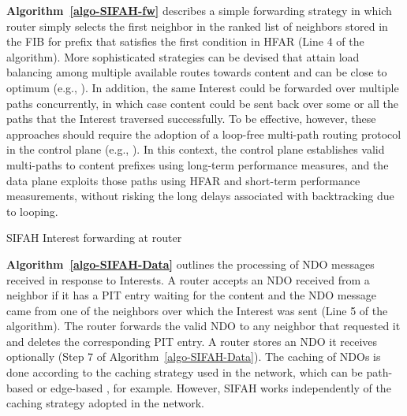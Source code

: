 \documentclass{ancs15-alternate}
\begin{document}
{\bf Algorithm~\ref{algo-SIFAH-fw} } describes a simple forwarding strategy 
in which router  simply selects the 
first  neighbor 
in the ranked list of neighbors stored in the FIB for prefix 
that satisfies the first condition in HFAR (Line 4 of the algorithm).
More sophisticated strategies can be devised that attain load balancing among multiple available  routes towards content and can be close to optimum (e.g., \cite{vutukury}). In addition, the same Interest could be forwarded over multiple paths concurrently, in which case  content could be sent back  over some or all the paths that the Interest traversed successfully.
To be effective, however, these  approaches should  require the adoption of a loop-free  multi-path routing protocol in the control plane (e.g., \cite{dcr, dcr-mcast}). In this context, the control plane establishes valid multi-paths to content prefixes using  long-term performance measures, and the data plane exploits those paths using HFAR and short-term performance measurements, without risking the long delays associated with backtracking due to looping. 

\begin{algorithm}[h]
\caption{SIFAH  Interest forwarding at router }
\label{algo-SIFAH-fw}
{\fontsize{8}{8}\selectfont
\begin{algorithmic}[1]

			\IF{}
			\ENDIF
		\ENDFOR

\end{algorithmic}}
\end{algorithm}


{\bf Algorithm~\ref{algo-SIFAH-Data}} outlines the processing of NDO messages received in response to Interests.  A router accepts an NDO received from a neighbor if it has a PIT entry waiting for the content and the NDO message came from one of the neighbors over which the Interest was sent (Line 5 of the algorithm). 
The router   forwards the valid NDO to any neighbor that requested it and deletes the corresponding PIT entry. 
A router stores an NDO it receives optionally (Step 7 of Algorithm~\ref{algo-SIFAH-Data}).
The caching  of NDOs is done according to the   caching strategy used in the network, which can be path-based or edge-based \cite{caching}, for example. However, SIFAH works independently of the caching strategy adopted in the network.
\end{document}
